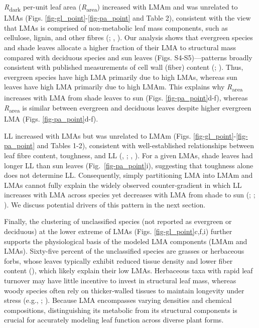 \documentclass[
  12pt,
  letterpaper,
  DIV=11,
  numbers=noendperiod]{scrartcl}
\begin{document}
\emph{R}\textsubscript{dark} per-unit leaf area
(\emph{R}\textsubscript{area}) increased with LMAm and was unrelated to
LMAs (Figs. \ref{fig-gl_point}-\ref{fig-pa_point} and Table 2),
consistent with the view that LMAs is comprised of non-metabolic leaf
mass components, such as cellulose, lignin, and other fibres
(;
,
). Our analysis shows that evergreen
species and shade leaves allocate a higher fraction of their LMA to
structural mass compared with deciduous species and sun leaves (Figs.
S4-S5)---patterns broadly consistent with published measurements of cell
wall (fiber) content (;
). Thus, evergreen
species have high LMA primarily due to high LMAs, whereas sun leaves
have high LMA primarily due to high LMAm. This explains why
\emph{R}\textsubscript{area} increases with LMA from shade leaves to sun
(Figs. \ref{fig-pa_point}d-f), whereas \emph{R}\textsubscript{area} is
similar between evergreen and deciduous leaves despite higher evergreen
LMA (Figs. \ref{fig-pa_point}d-f).

LL increased with LMAs but was unrelated to LMAm (Figs.
\ref{fig-gl_point}-\ref{fig-pa_point} and Tables 1-2), consistent with
well-established relationships between leaf fibre content, toughness,
and LL (,
; , ). For a given LMAs, shade
leaves had longer LL than sun leaves (Fig.~\ref{fig-pa_point}i),
suggesting that toughness alone does not determine LL. Consequently,
simply partitioning LMA into LMAm and LMAs cannot fully explain the
widely observed counter‐gradient in which LL increases with LMA across
species yet decreases with LMA from shade to sun
(;
;
). We discuss potential
drivers of this pattern in the next section.

Finally, the clustering of unclassified species (not reported as
evergreen or deciduous) at the lower extreme of LMAs (Figs.
\ref{fig-gl_point}c,f,i) further supports the physiological basis of the
modeled LMA components (LMAm and LMAs). Sixty-five percent of the
unclassified species are grasses or herbaceous forbs, whose leaves
typically exhibit reduced tissue density and lower fiber content
(), which likely explain
their low LMAs. Herbaceous taxa with rapid leaf turnover may have little
incentive to invest in structural leaf mass, whereas woody species often
rely on thicker‐walled tissues to maintain longevity under stress (e.g.,
;
). Because LMA encompasses
varying densities and chemical compositions, distinguishing its
metabolic from its structural components is crucial for accurately
modeling leaf function across diverse plant forms.
\end{document}
